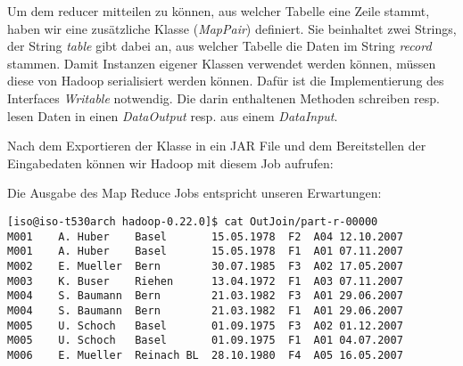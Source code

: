 \documentclass[11pt,a4paper,parskip=half]{scrartcl}
\begin{document}
Um dem reducer mitteilen zu können, aus welcher Tabelle eine Zeile stammt, haben wir eine zusätzliche Klasse (\emph{MapPair}) definiert. Sie beinhaltet zwei Strings, der String \emph{table} gibt dabei an, aus welcher Tabelle die Daten im String \emph{record} stammen. Damit Instanzen eigener Klassen verwendet werden können, müssen diese von Hadoop serialisiert werden können. Dafür ist die Implementierung des Interfaces \emph{Writable} notwendig. Die darin enthaltenen Methoden schreiben resp. lesen Daten in einen \emph{DataOutput} resp. aus einem \emph{DataInput}.



Nach dem Exportieren der Klasse in ein JAR File und dem Bereitstellen der Eingabedaten können wir Hadoop mit diesem Job aufrufen:



Die Ausgabe des Map Reduce Jobs entspricht unseren Erwartungen:
\begin{lstlisting}
[iso@iso-t530arch hadoop-0.22.0]$ cat OutJoin/part-r-00000 
M001	A. Huber	Basel		15.05.1978	F2	A04	12.10.2007
M001	A. Huber	Basel		15.05.1978	F1	A01	07.11.2007
M002	E. Mueller	Bern		30.07.1985	F3	A02	17.05.2007
M003	K. Buser	Riehen		13.04.1972	F1	A03	07.11.2007
M004	S. Baumann	Bern		21.03.1982	F3	A01	29.06.2007
M004	S. Baumann	Bern		21.03.1982	F1	A01	29.06.2007
M005	U. Schoch	Basel		01.09.1975	F3	A02	01.12.2007
M005	U. Schoch	Basel		01.09.1975	F1	A01	04.07.2007
M006	E. Mueller	Reinach BL	28.10.1980	F4	A05	16.05.2007
\end{lstlisting}
\end{document}
